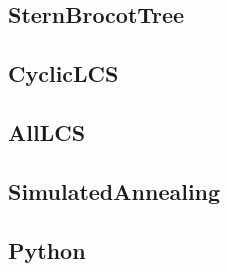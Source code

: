 	\subsection{SternBrocotTree}
	
	\subsection{CyclicLCS}
	
	\subsection{AllLCS}
	
	\subsection{SimulatedAnnealing}
	
	\subsection{Python}
	
